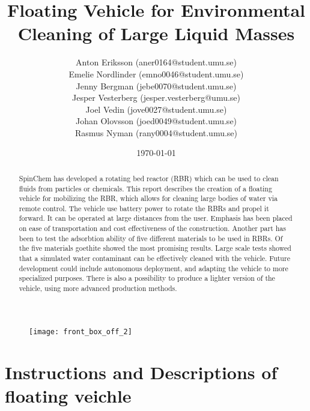 \documentclass[11pt]{article}
\title{Floating Vehicle for Environmental \\ Cleaning of Large Liquid Masses}
\author{Anton Eriksson (aner0164@student.umu.se) \\
  Emelie Nordlinder (emno0046@student.umu.se) \\
  Jenny Bergman (jebe0070@student.umu.se) \\
  Jesper Vesterberg (jesper.vesterberg@umu.se) \\
  Joel Vedin (jove0027@student.umu.se) \\
  Johan Olovsson (joed0049@student.umu.se) \\
Rasmus Nyman (rany0004@student.umu.se)}
\date{\today}
\begin{document}
\begin{titlepage}
  \maketitle
  \thispagestyle{fancy}
  \rhead{\today}

\begin{figure}[H]
   \centering
   \texttt{[image: front\_box\_off\_2]}
\end{figure}

  \begin{abstract}
    \noindent
    SpinChem\textsuperscript{\textregistered} has developed a rotating bed reactor (RBR) which can be used to
    clean fluids from particles or chemicals. This report describes the creation of a floating
    vehicle for mobilizing the RBR, which allows for cleaning large bodies of
    water via remote control. The vehicle use battery power to rotate the RBRs and propel it forward. It can be operated at large distances from the
    user. Emphasis has been placed on ease of transportation and cost
    effectiveness of the construction. Another part has been to test the adsorbtion ability of five different materials to be used in RBRs. Of the five materials goethite showed the most promising results. Large scale tests showed that a simulated water
    contaminant can be effectively cleaned with the vehicle. Future development
    could include autonomous deployment, and adapting the vehicle to more specialized purposes. There is also a possibility
    to produce a lighter version of the vehicle, using more advanced
    production methods.
  \end{abstract}

\end{titlepage}

\lhead{\thetitle}
\rhead{\today}
\cfoot{\thepage}


\clearpage
\tableofcontents
\clearpage


\clearpage
\part{Instructions and Descriptions of floating veichle}

\end{document}
